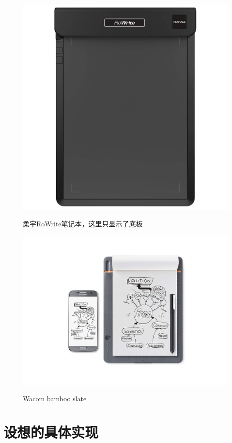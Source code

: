 \documentclass{article}
\begin{document}
\begin{figure}[!htb]
  \includegraphics[width=\linewidth]{rowrite.jpg}
  \label{fig:awesome_image1}
  \caption{柔宇RoWrite笔记本，这里只显示了底板}
\endminipage
{}%
  \includegraphics[width=\linewidth]{bamboo.jpg}
  \label{fig:awesome_image3}
  \caption{Wacom bamboo slate}
\endminipage
\end{figure}

\section{设想的具体实现}
\end{document}
